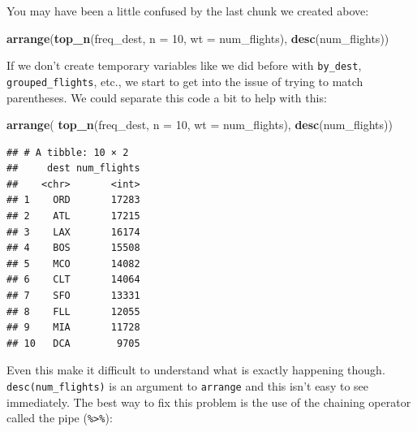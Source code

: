 \documentclass[]{tufte-book}
\newenvironment{Shaded}{\begin{snugshade}}{\end{snugshade}}
\newcommand{\KeywordTok}[1]{\textcolor[rgb]{0.13,0.29,0.53}{\textbf{{#1}}}}
\newcommand{\DataTypeTok}[1]{\textcolor[rgb]{0.13,0.29,0.53}{{#1}}}
\newcommand{\DecValTok}[1]{\textcolor[rgb]{0.00,0.00,0.81}{{#1}}}
\newcommand{\StringTok}[1]{\textcolor[rgb]{0.31,0.60,0.02}{{#1}}}
\newcommand{\NormalTok}[1]{{#1}}
\begin{document}
You may have been a little confused by the last chunk we created above:

\begin{Shaded}
\begin{Highlighting}[]
\KeywordTok{arrange}\NormalTok{(}\KeywordTok{top_n}\NormalTok{(freq_dest, }\DataTypeTok{n =} \DecValTok{10}\NormalTok{, }\DataTypeTok{wt =} \NormalTok{num_flights), }\KeywordTok{desc}\NormalTok{(num_flights))}
\end{Highlighting}
\end{Shaded}

If we don't create temporary variables like we did before with
\texttt{by\_dest}, \texttt{grouped\_flights}, etc., we start to get into
the issue of trying to match parentheses. We could separate this code a
bit to help with this:

\begin{Shaded}
\begin{Highlighting}[]
\KeywordTok{arrange}\NormalTok{(}
  \KeywordTok{top_n}\NormalTok{(freq_dest, }
        \DataTypeTok{n =} \DecValTok{10}\NormalTok{,}
        \DataTypeTok{wt =} \NormalTok{num_flights), }
  \KeywordTok{desc}\NormalTok{(num_flights))}
\end{Highlighting}
\end{Shaded}

\begin{verbatim}
## # A tibble: 10 × 2
##     dest num_flights
##    <chr>       <int>
## 1    ORD       17283
## 2    ATL       17215
## 3    LAX       16174
## 4    BOS       15508
## 5    MCO       14082
## 6    CLT       14064
## 7    SFO       13331
## 8    FLL       12055
## 9    MIA       11728
## 10   DCA        9705
\end{verbatim}

Even this make it difficult to understand what is exactly happening
though. \texttt{desc(num\_flights)} is an argument to \texttt{arrange}
and this isn't easy to see immediately. The best way to fix this problem
is the use of the chaining operator called the pipe
(\texttt{\%\textgreater{}\%}):

\begin{Shaded}
\end{Shaded}
\end{document}
